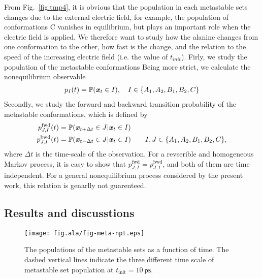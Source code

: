 \documentclass[aip,jcp,a4paper,preprint,onecolumn]{revtex4-1}
\newcommand{\vect}[1]{\textbf{\textit{#1}}}
\newcommand{\fwd}[0]{\textrm{fwd}}
\newcommand{\bwd}[0]{\textrm{bwd}}
\begin{document}
From Fig.~\ref{fig:tmp4}, it is obvious that the population in each
metastable sets changes due to the external electric field, for
example, the population of conformations C vanishes in equilibrium,
but plays an important role when the electric field is applied. We
therefore want to study how the alanine changes from one conformation
to the other, how fast is the change, and the relation to the speed of
the increasing electric field (i.e. the value of $t_{init}$). 
Firly, we study the population of the metastable conformations
Being more strict, we calculate the nonequilibrium observable
\begin{align}
  p_I(t) = \mathbb P (\vect x_t \in I), \quad  I \in \{A_1, A_2, B_1, B_2, C\}
\end{align}
Secondly, we study the
forward and backward transition probability of the metastable conformations, which is defined by
\begin{align}
  p^{\fwd}_{J,I}(t) & = \mathbb P( \vect x_{t+\Delta t} \in J | \vect x_t \in I) \\
  p^{\bwd}_{J,I}(t) & = \mathbb P( \vect x_{t-\Delta t} \in J | \vect x_t \in I)
  \qquad I, J \in \{A_1, A_2, B_1, B_2, C\},
\end{align}
where $\Delta t$ is the time-scale of the observation.
For a revserible and homogeneous Markov process, it is easy to show
that $p^{\fwd}_{J,I} = p^{\bwd}_{J,I}$, and both of them are time independent. For a general nonequilibrium
process considered by the present work, this relation is genarlly not guarenteed.


\subsection{Results and discusstions}
\begin{figure}
  \centering
  \texttt{[image: fig.ala/fig-meta-npt.eps]}
  \caption{The populations of the metastable sets as a function of time.
    The dashed vertical lines indicate the three different time scale of
  metastable set population at $t_{\textrm{init}} = 10~\textsf{ps}$.}
  \label{fig:tmp5}
\end{figure}
\end{document}
